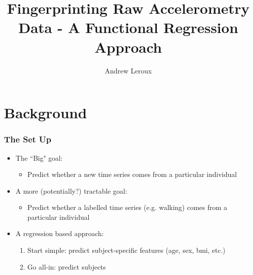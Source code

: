 \documentclass[10pt]{beamer}\usepackage[]{graphicx}\usepackage[]{color}
\newcommand\makebeamertitle{\frame{\maketitle}}%
\begin{document}
\title[]{Fingerprinting Raw Accelerometry Data - A Functional Regression Approach}
\author[]{Andrew Leroux}
\makebeamertitle






\section{Background}

\begin{frame}
\frametitle{The Set Up}
\begin{itemize}
\item The ``Big" goal: 
    \begin{itemize}
    \item Predict whether a new time series comes from a particular individual 
    \end{itemize}
\item A more (potentially?) tractable goal:
    \begin{itemize}
    \item Predict whether a labelled time series (e.g. walking) comes from a particular individual
    \end{itemize}
\item A regression based approach:
    \begin{enumerate}
    \item Start simple: predict subject-specific features (age, sex, bmi, etc.)
    \item Go all-in: predict subjects 
    \end{enumerate}
\end{itemize}
\end{frame}
\end{document}
